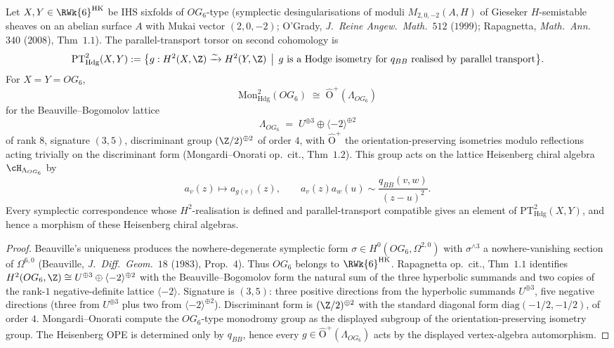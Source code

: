 \begin{theorem}
\label{thm:rw6-markman-monodromy-og6}
Let $X, Y \in \RWk{6}^{\mathrm{HK}}$ be IHS sixfolds of $OG_6$-type
(symplectic desingularisations of moduli $M_{2, 0, -2}(A, H)$ of
Gieseker $H$-semistable sheaves on an abelian surface $A$ with Mukai
vector $(2, 0, -2)$; O'Grady, \emph{J.\ Reine Angew.\ Math.}~$512$
\textup{(}$1999$\textup{)}; Rapagnetta, \emph{Math.\ Ann.}~$340$
\textup{(}$2008$\textup{)}, Thm~$1.1$). The parallel-transport torsor
on second cohomology is
\[
 \mathrm{PT}^2_{\mathrm{Hdg}}(X,Y)
 :=
 \bigl\{
 g:H^2(X,\Z)\xrightarrow{\sim}H^2(Y,\Z)
 \,\bigm|\,
 g \text{ is a Hodge isometry for } q_{BB}
 \text{ realised by parallel transport}
 \bigr\}.
\]
For $X=Y=OG_6$,
\[
 \mathrm{Mon}^2_{\mathrm{Hdg}}(OG_6)
 \;\cong\;
 \widehat{\mathrm{O}}^+(\Lambda_{OG_6})
\]
for the Beauville--Bogomolov lattice
\[
 \Lambda_{OG_6} \;=\; U^{\oplus 3} \oplus \langle -2 \rangle^{\oplus 2}
\]
of rank $8$, signature $(3, 5)$, discriminant group
$(\Z/2)^{\oplus 2}$ of order $4$, with $\widehat{\mathrm{O}}^+$
the orientation-preserving isometries modulo reflections acting
trivially on the discriminant form (Mongardi--Onorati op.\ cit.,
Thm~$1.2$). This group acts on the lattice Heisenberg chiral algebra
\(\cH_{\Lambda_{OG_6}}\) by
\[
 a_v(z) \longmapsto a_{g(v)}(z),
 \qquad
 a_v(z)a_w(u)\sim \frac{q_{BB}(v,w)}{(z-u)^2}.
\]
Every symplectic correspondence whose \(H^2\)-realisation is defined
and parallel-transport compatible gives an element of
\(\mathrm{PT}^2_{\mathrm{Hdg}}(X,Y)\), and hence a morphism of these
Heisenberg chiral algebras.
\end{theorem}

\begin{proof}
Beauville's uniqueness produces the nowhere-degenerate symplectic
form $\sigma \in H^0(OG_6, \Omega^{2, 0})$ with
$\sigma^{\wedge 3}$ a nowhere-vanishing section of $\Omega^{6, 0}$
(Beauville, \emph{J.\ Diff.\ Geom.}~$18$ \textup{(}$1983$\textup{)}, Prop.~$4$).
Thus \(OG_6\) belongs to \(\RWk{6}^{\mathrm{HK}}\).
Rapagnetta op.\ cit., Thm~$1.1$ identifies
$H^2(OG_6, \Z) \cong U^{\oplus 3} \oplus \langle -2 \rangle^{\oplus 2}$
with the Beauville--Bogomolov form the natural sum of the three
hyperbolic summands and two copies of the rank-$1$ negative-definite
lattice $\langle -2 \rangle$. Signature is $(3, 5)$: three
positive directions from the hyperbolic summands $U^{\oplus 3}$, five
negative directions (three from $U^{\oplus 3}$ plus two from
$\langle -2 \rangle^{\oplus 2}$). Discriminant form is
$(\Z/2)^{\oplus 2}$ with the standard diagonal form
$\mathrm{diag}(-1/2, -1/2)$, of order $4$.
Mongardi--Onorati compute the \(OG_6\)-type monodromy group as the
displayed subgroup of the orientation-preserving isometry group.
The Heisenberg OPE is determined only by \(q_{BB}\), hence every
\(g\in\widehat{\mathrm{O}}^+(\Lambda_{OG_6})\) acts by the displayed
vertex-algebra automorphism.
\end{proof}

